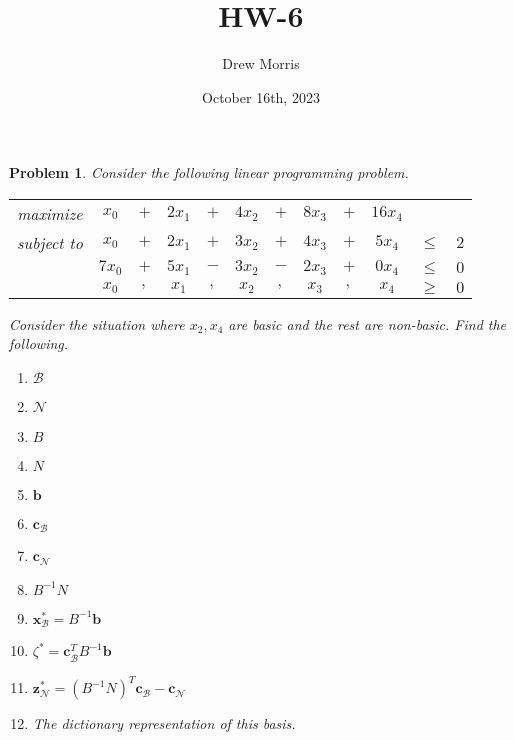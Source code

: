 \documentclass[12pt,oneside]{amsart}
\title{HW-6}
\author{Drew Morris}
\date{October 16th, 2023}
\numberwithin{equation}{section}
\numberwithin{figure}{section}
\theoremstyle{plain}
\newtheorem{prob}{Problem}
\theoremstyle{definition}
\begin{document}
\maketitle

\begin{prob}
Consider the following linear programming problem. \\
\begin{center}\begin{tabular}{cccccccccccc}
  maximize   & $x_0$  & $+$ & $2x_1$ & $+$ & $4x_2$ & $+$ & $8x_3$ & $+$ & $16x_4$ &        &     \\
  subject to & $x_0$  & $+$ & $2x_1$ & $+$ & $3x_2$ & $+$ & $4x_3$ & $+$ & $5x_4$  & $\leq$ & $2$ \\
             & $7x_0$ & $+$ & $5x_1$ & $-$ & $3x_2$ & $-$ & $2x_3$ & $+$ & $0x_4$  & $\leq$ & $0$ \\
             & $x_0$  & $,$ & $x_1$  & $,$ & $x_2$  & $,$ & $x_3$  & $,$ & $x_4$   & $\geq$ & $0$ \\
\end{tabular}\end{center}
Consider the situation where $x_2,x_4$ are basic and the rest are non-basic. Find 
the following. \\
\begin{enumerate}
  \item $\mathscr{B}$ \\
  \item $\mathscr{N}$ \\
  \item $B$ \\
  \item $N$ \\
  \item $\mathbf{b}$ \\
  \item $\mathbf{c}_{\mathscr{B}}$ \\
  \item $\mathbf{c}_{\mathscr{N}}$ \\
  \item $B^{-1}N$ \\
  \item $\mathbf{x}^*_{\mathscr{B}} = B^{-1}\mathbf{b}$ \\
  \item $\zeta^* = \mathbf{c}^T_{\mathscr{B}}B^{-1}\mathbf{b}$ \\
  \item $\mathbf{z}^*_{\mathscr{N}} = (B^{-1}N)^T\mathbf{c}_{\mathscr{B}} - \mathbf{c}_{\mathscr{N}}$ \\
  \item The dictionary representation of this basis. \\
\end{enumerate}
\end{prob} \pagebreak
\end{document}
